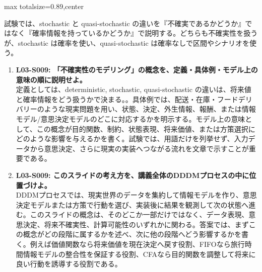 \begin{minipage}[t]{0.58\textwidth}
\begin{adjustbox}{max totalsize={\textwidth}{0.89\textheight},center}
\begin{minipage}{\textwidth}
試験では、stochastic と quasi-stochastic の違いを『不確実であるかどうか』ではなく『確率情報を持っているかどうか』で説明する。どちらも不確実性を扱うが、stochastic は確率を使い、quasi-stochastic は確率なしで区間やシナリオを使う。\par{}\begin{enumerate}\item \textbf{L03-S009: 「不確実性のモデリング」の概念を、定義・具体例・モデル上の意味の順に説明せよ。}\\定義としては、deterministic, stochastic, quasi-stochastic の違いは、将来値と確率情報をどう扱うかで決まる。。具体例では、配送・在庫・フードデリバリーのような現実問題を用い、状態、決定、外生情報、報酬、または情報モデル/意思決定モデルのどこに対応するかを明示する。モデル上の意味として、この概念が目的関数、制約、状態表現、将来価値、または方策選択にどのような影響を与えるかを書く。試験では、用語だけを列挙せず、入力データから意思決定、さらに現実の実装へつながる流れを文章で示すことが重要である。\item \textbf{L03-S009: このスライドの考え方を、講義全体のDDDMプロセスの中に位置づけよ。}\\DDDMプロセスでは、現実世界のデータを集約して情報モデルを作り、意思決定モデルまたは方策で行動を選び、実装後に結果を観測して次の状態へ進む。このスライドの概念は、そのどこか一部だけではなく、データ表現、意思決定、将来不確実性、計算可能性のいずれかに関わる。答案では、まずこの概念がどの段階に属するかを述べ、次に他の段階へどう影響するかを書く。例えば価値関数なら将来価値を現在決定へ戻す役割、FIFOなら旅行時間情報モデルの整合性を保証する役割、CFAなら目的関数を調整して将来に良い行動を誘導する役割である。\end{enumerate}
\end{minipage}
\end{adjustbox}
\end{minipage}


